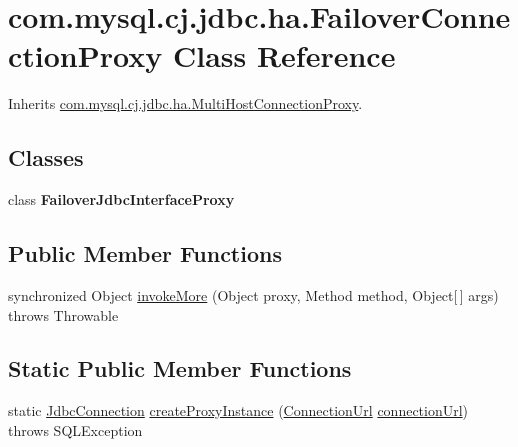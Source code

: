 \hypertarget{classcom_1_1mysql_1_1cj_1_1jdbc_1_1ha_1_1_failover_connection_proxy}{}\section{com.\+mysql.\+cj.\+jdbc.\+ha.\+Failover\+Connection\+Proxy Class Reference}
\label{classcom_1_1mysql_1_1cj_1_1jdbc_1_1ha_1_1_failover_connection_proxy}


Inherits \mbox{\hyperlink{classcom_1_1mysql_1_1cj_1_1jdbc_1_1ha_1_1_multi_host_connection_proxy}{com.\+mysql.\+cj.\+jdbc.\+ha.\+Multi\+Host\+Connection\+Proxy}}.

\subsection*{Classes}
\begin{DoxyCompactItemize}
\item 
class {\bfseries Failover\+Jdbc\+Interface\+Proxy}
\end{DoxyCompactItemize}
\subsection*{Public Member Functions}
\begin{DoxyCompactItemize}
\item 
synchronized Object \mbox{\hyperlink{classcom_1_1mysql_1_1cj_1_1jdbc_1_1ha_1_1_failover_connection_proxy_ad05c49207de1dc3e35f5f56461f70036}{invoke\+More}} (Object proxy, Method method, Object\mbox{[}$\,$\mbox{]} args)  throws Throwable 
\end{DoxyCompactItemize}
\subsection*{Static Public Member Functions}
\begin{DoxyCompactItemize}
\item 
static \mbox{\hyperlink{interfacecom_1_1mysql_1_1cj_1_1jdbc_1_1_jdbc_connection}{Jdbc\+Connection}} \mbox{\hyperlink{classcom_1_1mysql_1_1cj_1_1jdbc_1_1ha_1_1_failover_connection_proxy_ae28f0509d52d59d9da141399ea8d3fc4}{create\+Proxy\+Instance}} (\mbox{\hyperlink{classcom_1_1mysql_1_1cj_1_1conf_1_1_connection_url}{Connection\+Url}} \mbox{\hyperlink{classcom_1_1mysql_1_1cj_1_1jdbc_1_1ha_1_1_multi_host_connection_proxy_aae3d1ff31056ba5a6686ce6e692a64a8}{connection\+Url}})  throws S\+Q\+L\+Exception 
\end{DoxyCompactItemize}
